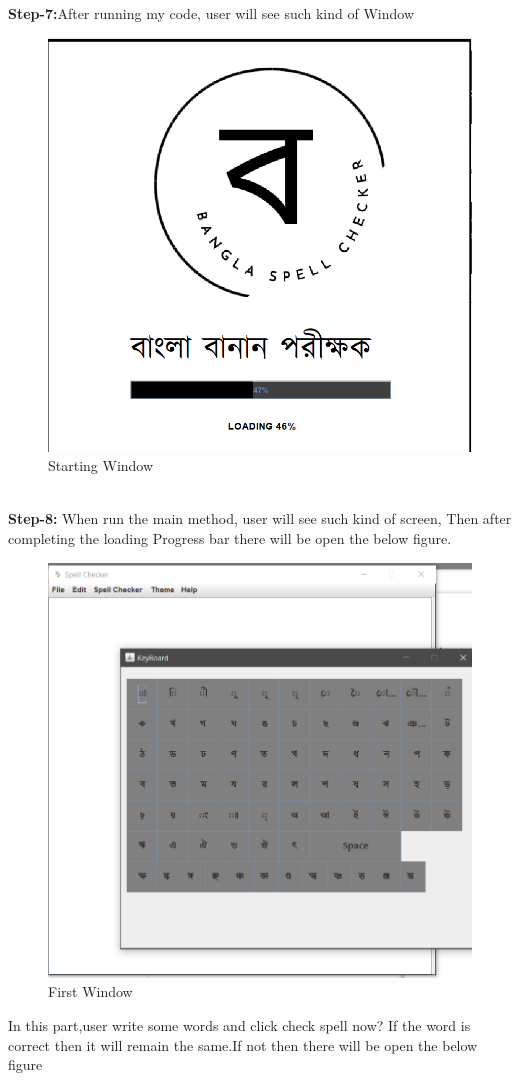 \documentclass[12pt,letterpaper]{article}
\begin{document}
\begin{flushleft}
\textbf{Step-7:}After running my code, user will see such kind of Window
\begin{figure}[h]
    \centering
    \includegraphics[scale=0.8]{start.png}
    \caption{Starting Window}
    \label{fig:myfigure}
\end{figure} \\
\textbf{Step-8:}
When run the main method, user will see such kind of screen, Then after completing the 
loading Progress bar there will be open the below figure.
\begin{figure}[h]
    \centering
    \includegraphics[scale=0.8]{main.png}
    \caption{First Window}
    \label{fig:myfigure}
\end{figure}
In this part,user write some words and click check spell now? If the word is correct then it will remain 
the same.If not then there will be open the below figure


\end{flushleft}
\end{document}
